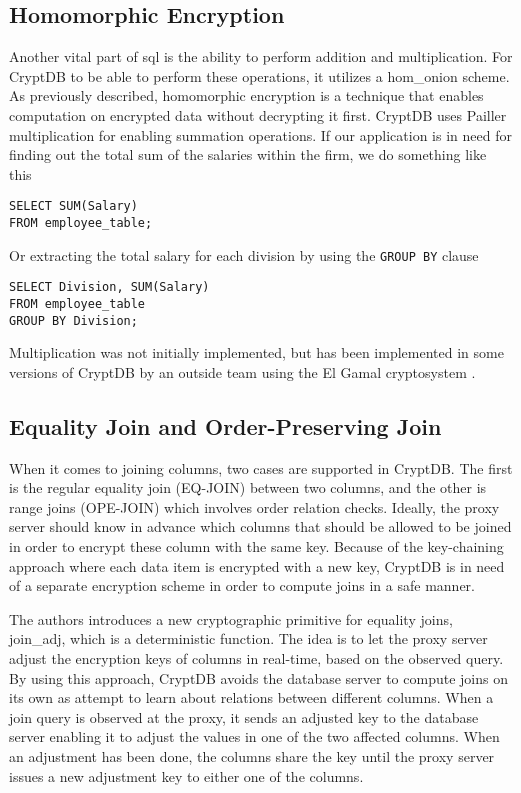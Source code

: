 \subsection{Homomorphic Encryption}
Another vital part of \Gls{sql} is the ability to perform addition and multiplication. For CryptDB to be able to perform these operations, it utilizes a \Gls{hom_onion} scheme. As previously described, homomorphic encryption is a technique that enables computation on encrypted data without decrypting it first. CryptDB uses Pailler multiplication \cite{Paillier} for enabling summation operations. If our application is in need for finding out the total sum of the salaries within the firm, we do something like this

\begin{verbatim}
SELECT SUM(Salary)
FROM employee_table;
\end{verbatim}

\noindent
Or extracting the total salary for each division by using the \verb!GROUP BY! clause

\begin{verbatim}
SELECT Division, SUM(Salary)
FROM employee_table
GROUP BY Division;
\end{verbatim}

Multiplication was not initially implemented, but has been implemented in some versions of CryptDB by an outside team using the El Gamal cryptosystem \cite{cryptdb_guidelines}. 


\subsection{Equality Join and Order-Preserving Join}
When it comes to joining columns, two cases are supported in CryptDB. The first is the regular equality join (EQ-JOIN) between two columns, and the other is range joins (OPE-JOIN) which involves order relation checks. Ideally, the proxy server should know in advance which columns that should be allowed to be joined in order to encrypt these column with the same key. Because of the key-chaining approach where each data item is encrypted with a new key, CryptDB is in need of a separate encryption scheme in order to compute joins in a safe manner.

The authors \citep{CryptDB_Main_Paper} introduces a new cryptographic primitive for equality joins, \gls{join_adj}, which is a deterministic function. The idea is to let the proxy server adjust the encryption keys of columns in real-time, based on the observed query. By using this approach, CryptDB avoids the database server to compute joins on its own as attempt to learn about relations between different columns. When a join query is observed at the proxy, it sends an adjusted key to the database server enabling it to adjust the values in one of the two affected columns. When an adjustment has been done, the columns share the key until the proxy server issues a new adjustment key to either one of the columns.

